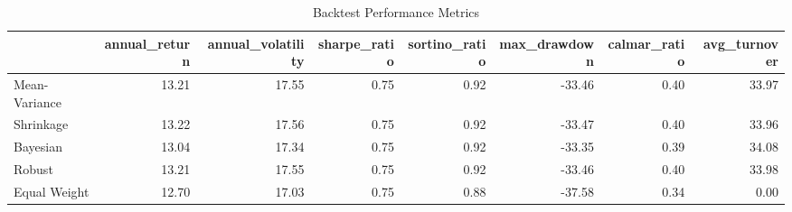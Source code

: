\begin{table}[htbp]
\caption{Backtest Performance Metrics}
\label{tab:backtest_results}
\begin{tabular}{lrrrrrrr}
\toprule
 & annual_return & annual_volatility & sharpe_ratio & sortino_ratio & max_drawdown & calmar_ratio & avg_turnover \\
\midrule
Mean-Variance & 13.21 & 17.55 & 0.75 & 0.92 & -33.46 & 0.40 & 33.97 \\
Shrinkage & 13.22 & 17.56 & 0.75 & 0.92 & -33.47 & 0.40 & 33.96 \\
Bayesian & 13.04 & 17.34 & 0.75 & 0.92 & -33.35 & 0.39 & 34.08 \\
Robust & 13.21 & 17.55 & 0.75 & 0.92 & -33.46 & 0.40 & 33.98 \\
Equal Weight & 12.70 & 17.03 & 0.75 & 0.88 & -37.58 & 0.34 & 0.00 \\
\bottomrule
\end{tabular}
\end{table}
